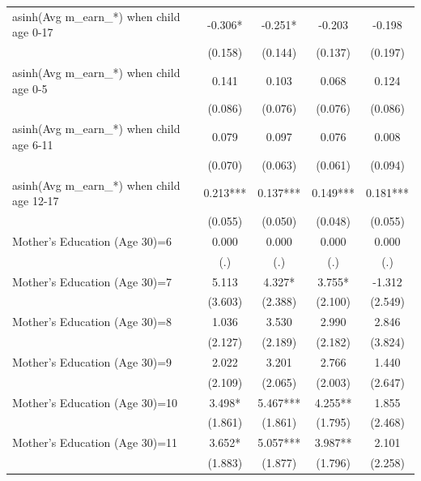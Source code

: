 \begin{table}[ht!]
{\begin{tabular}{l*{4}{c}}
asinh(Avg m\_earn\_*) when child age 0-17&      -0.306*  &      -0.251*  &      -0.203   &      -0.198   \\
                    &     (0.158)   &     (0.144)   &     (0.137)   &     (0.197)   \\
asinh(Avg m\_earn\_*) when child age 0-5&       0.141   &       0.103   &       0.068   &       0.124   \\
                    &     (0.086)   &     (0.076)   &     (0.076)   &     (0.086)   \\
asinh(Avg m\_earn\_*) when child age 6-11&       0.079   &       0.097   &       0.076   &       0.008   \\
                    &     (0.070)   &     (0.063)   &     (0.061)   &     (0.094)   \\
asinh(Avg m\_earn\_*) when child age 12-17&       0.213***&       0.137***&       0.149***&       0.181***\\
                    &     (0.055)   &     (0.050)   &     (0.048)   &     (0.055)   \\
Mother's Education (Age 30)=6&       0.000   &       0.000   &       0.000   &       0.000   \\
                    &         (.)   &         (.)   &         (.)   &         (.)   \\
Mother's Education (Age 30)=7&       5.113   &       4.327*  &       3.755*  &      -1.312   \\
                    &     (3.603)   &     (2.388)   &     (2.100)   &     (2.549)   \\
Mother's Education (Age 30)=8&       1.036   &       3.530   &       2.990   &       2.846   \\
                    &     (2.127)   &     (2.189)   &     (2.182)   &     (3.824)   \\
Mother's Education (Age 30)=9&       2.022   &       3.201   &       2.766   &       1.440   \\
                    &     (2.109)   &     (2.065)   &     (2.003)   &     (2.647)   \\
Mother's Education (Age 30)=10&       3.498*  &       5.467***&       4.255** &       1.855   \\
                    &     (1.861)   &     (1.861)   &     (1.795)   &     (2.468)   \\
Mother's Education (Age 30)=11&       3.652*  &       5.057***&       3.987** &       2.101   \\
                    &     (1.883)   &     (1.877)   &     (1.796)   &     (2.258)   \\

\end{tabular}}
\end{table}
